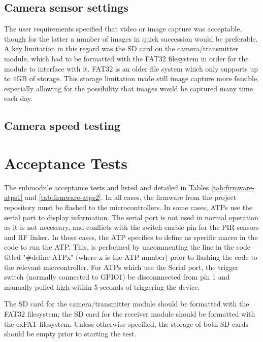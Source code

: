 \documentclass[class=report,11pt,crop=false]{standalone}
\begin{document}
\subsection{Camera sensor settings}

The user requirements specified that video or image capture was acceptable, though for the latter a number of images in quick succession would be preferable. A key limitation in this regard was the SD card on the camera/transmitter module, which had to be formatted with the FAT32 filesystem in order for the module to interface with it. FAT32 is an older file system which only supports up to 4GB of storage. This storage limitation made still image capture more feasible, especially allowing for the possibility that images would be captured many time each day.



\subsection{Camera speed testing}


\section{Acceptance Tests \label{s:firmware-atps}}

The submodule acceptance tests and listed and detailed in Tables \ref{tab:firmware-atps1} and \ref{tab:firmware-atps2}. In all cases, the firmware from the project repository must be flashed to the microcontrollers. In some cases, ATPs use the serial port to display information. The serial port is not used in normal operation as it is not necessary, and conflicts with the switch enable pin for the PIR sensors and RF linker.  In these cases, the ATP specifies to define as specific macro in the code to run the ATP. This, is performed by uncommenting the line in the code titled "\#define ATPx" (where x is the ATP number) prior to flashing the code to the relevant micrcontroller. For ATPs which use the Serial port, the trigger switch (normally connected to GPIO1) be disconnnected from pin 1 and manually pulled high within 5 seconds of triggering the device.

The SD card for the camera/transmitter module should be formatted with the FAT32 filesystem; the SD card for the receiver module should be formatted with the exFAT filesystem. Unless otherwise specified, the storage of both SD cards should be empty prior to starting the test.
\end{document}
